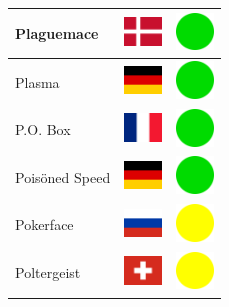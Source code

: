 \documentclass[12pt, a4paper, twoside]{report}
\begin{document}
\begin{center}
\begin{longtable}{|p{5cm}|p{2cm}|p{2cm}|}
 Plaguemace                                                 & \includegraphics[width=1cm]{../img/flags/dk} &   \includegraphics[width=1cm]{../likes/y} \\ \hline
 Plasma                                                     & \includegraphics[width=1cm]{../img/flags/de} &   \includegraphics[width=1cm]{../likes/y} \\ \hline
 P.O. Box                                                   & \includegraphics[width=1cm]{../img/flags/fr} &   \includegraphics[width=1cm]{../likes/y} \\ \hline
 Poisöned Speed                                             & \includegraphics[width=1cm]{../img/flags/de} &   \includegraphics[width=1cm]{../likes/y} \\ \hline
 Pokerface                                                  & \includegraphics[width=1cm]{../img/flags/ru} &   \includegraphics[width=1cm]{../likes/m} \\ \hline
 Poltergeist                                                & \includegraphics[width=1cm]{../img/flags/ch} &   \includegraphics[width=1cm]{../likes/m} \\ \hline

\end{longtable}
\end{center}
\end{document}
